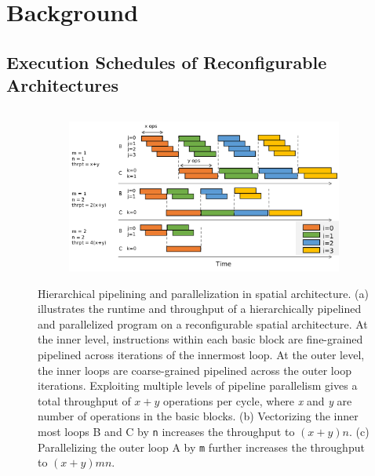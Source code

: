 \chapter{Background}\label{sec:background}

\section{Execution Schedules of Reconfigurable Architectures} 
\begin{figure}
\begin{subfigure}[b]{0.34\textwidth}
\inputminted{python}{code/spatialeg2.py}
\caption {
}
\end{subfigure}
\hfill
\begin{subfigure}[b]{0.65\textwidth}
\centering
\includegraphics[width=1.0\textwidth]{figs/pipeexec.pdf}
\caption {
}
\end{subfigure}
\caption[Hiearchical pipelining and parallelization on spatial architecture]{
Hierarchical pipelining and parallelization in spatial architecture.
(a) illustrates the runtime and throughput of a hierarchically pipelined and parallelized program on
a reconfigurable spatial architecture. 
At the inner level, instructions within each basic
block are fine-grained pipelined across iterations of the innermost loop. 
At the outer level, the inner loops are coarse-grained pipelined across the outer loop iterations.
Exploiting multiple levels of pipeline parallelism gives a total throughput of $x+y$ operations per
  cycle, where \emph{x} and \emph{y} are number of operations in the basic blocks.
(b) Vectorizing the inner most loops B and C by \texttt{n} increases the throughput to $(x+y)n$.
(c) Parallelizing the outer loop A by \texttt{m} further increases the throughput to $(x+y)mn$.
}
\label{fig:pipeexec}
\end{figure}

